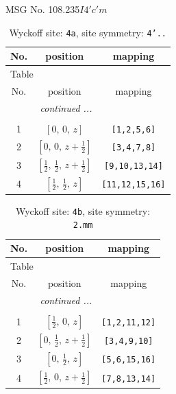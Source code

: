 \documentclass[fleqn,8pt]{jsarticle}
\begin{document}
\setcounter{MaxMatrixCols}{32}

\renewcommand{\tablename}{Table~}
\renewcommand{\figurename}{Figure~}
\begin{center}
\LARGE
MSG No. 108.235\quad$I4'c'm$
\end{center}
\renewcommand{\arraystretch}{1.2}
\begin{longtable}{ccc}
\caption{Wyckoff site: {\tt 4a}, site symmetry: {\tt 4'..}}
 \\
 \hline \hline
No. & position & mapping \\ \hline \endfirsthead

\multicolumn{2}{l}{\tablename\ \thetable{}} \\
 \hline \hline
No. & position & mapping \\ \hline \endhead

 \hline \hline
\multicolumn{2}{r}{\footnotesize\it continued ...} \\ \endfoot

 \hline \hline
\multicolumn{2}{r}{} \\ \endlastfoot

1 & $\left[ 0,\, 0,\, z \right]$ & {\tt [1,2,5,6]} \\ \hline
2 & $\left[ 0,\, 0,\, z + \frac{1}{2} \right]$ & {\tt [3,4,7,8]} \\ \hline
3 & $\left[ \frac{1}{2},\, \frac{1}{2},\, z + \frac{1}{2} \right]$ & {\tt [9,10,13,14]} \\ \hline
4 & $\left[ \frac{1}{2},\, \frac{1}{2},\, z \right]$ & {\tt [11,12,15,16]} \\
\end{longtable}
\renewcommand{\arraystretch}{1.2}
\begin{longtable}{ccc}
\caption{Wyckoff site: {\tt 4b}, site symmetry: {\tt 2.mm}}
 \\
 \hline \hline
No. & position & mapping \\ \hline \endfirsthead

\multicolumn{2}{l}{\tablename\ \thetable{}} \\
 \hline \hline
No. & position & mapping \\ \hline \endhead

 \hline \hline
\multicolumn{2}{r}{\footnotesize\it continued ...} \\ \endfoot

 \hline \hline
\multicolumn{2}{r}{} \\ \endlastfoot

1 & $\left[ \frac{1}{2},\, 0,\, z \right]$ & {\tt [1,2,11,12]} \\ \hline
2 & $\left[ 0,\, \frac{1}{2},\, z + \frac{1}{2} \right]$ & {\tt [3,4,9,10]} \\ \hline
3 & $\left[ 0,\, \frac{1}{2},\, z \right]$ & {\tt [5,6,15,16]} \\ \hline
4 & $\left[ \frac{1}{2},\, 0,\, z + \frac{1}{2} \right]$ & {\tt [7,8,13,14]} \\
\end{longtable}
\end{document}
